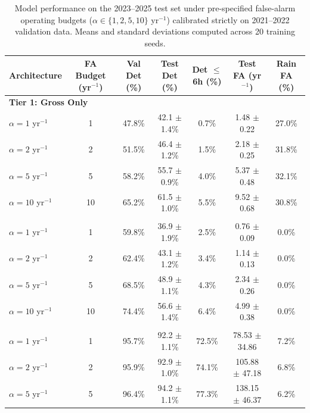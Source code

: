 \begin{table}[H]
\caption{Model performance on the 2023--2025 test set under pre-specified false-alarm operating budgets ($\alpha \in \{1, 2, 5, 10\}$ yr$^{-1}$) calibrated strictly on 2021--2022 validation data. Means and standard deviations computed across 20 training seeds.}
\label{tab:fa_budget_operating_points}
\centering
\small
\begin{tabularx}{\textwidth}{@{}X c c c c c c@{}}
\toprule
\textbf{Architecture} & \textbf{FA Budget (yr$^{-1}$)} & \textbf{Val Det (\%)} & \textbf{Test Det (\%)} & \textbf{Det $\le$ 6h (\%)} & \textbf{Test FA (yr$^{-1}$)} & \textbf{Rain FA (\%)} \\
\midrule
\multicolumn{7}{l}{\textbf{Tier 1: Gross Only}} \\[0.2em]
\quad $\alpha = 1$ yr$^{-1}$ & 1 & 47.8\% & 42.1 $\pm$ 1.4\% & 0.7\% & 1.48 $\pm$ 0.22 & 27.0\% \\
\quad $\alpha = 2$ yr$^{-1}$ & 2 & 51.5\% & 46.4 $\pm$ 1.2\% & 1.5\% & 2.18 $\pm$ 0.25 & 31.8\% \\
\quad $\alpha = 5$ yr$^{-1}$ & 5 & 58.2\% & 55.7 $\pm$ 0.9\% & 4.0\% & 5.37 $\pm$ 0.48 & 32.1\% \\
\quad $\alpha = 10$ yr$^{-1}$ & 10 & 65.2\% & 61.5 $\pm$ 1.0\% & 5.5\% & 9.52 $\pm$ 0.68 & 30.8\% \\
\addlinespace[0.3em]
\multicolumn{7}{l}{\textbf{Tier 1b: Gross + Weather}} \\[0.2em]
\quad $\alpha = 1$ yr$^{-1}$ & 1 & 59.8\% & 36.9 $\pm$ 1.9\% & 2.5\% & 0.76 $\pm$ 0.09 & 0.0\% \\
\quad $\alpha = 2$ yr$^{-1}$ & 2 & 62.4\% & 43.1 $\pm$ 1.2\% & 3.4\% & 1.14 $\pm$ 0.13 & 0.0\% \\
\quad $\alpha = 5$ yr$^{-1}$ & 5 & 68.5\% & 48.9 $\pm$ 1.1\% & 4.3\% & 2.34 $\pm$ 0.26 & 0.0\% \\
\quad $\alpha = 10$ yr$^{-1}$ & 10 & 74.4\% & 56.6 $\pm$ 1.4\% & 6.4\% & 4.99 $\pm$ 0.38 & 0.0\% \\
\addlinespace[0.3em]
\multicolumn{7}{l}{\textbf{Tier 2: Spectral Only}} \\[0.2em]
\quad $\alpha = 1$ yr$^{-1}$ & 1 & 95.7\% & 92.2 $\pm$ 1.1\% & 72.5\% & 78.53 $\pm$ 34.86 & 7.2\% \\
\quad $\alpha = 2$ yr$^{-1}$ & 2 & 95.9\% & 92.9 $\pm$ 1.0\% & 74.1\% & 105.88 $\pm$ 47.18 & 6.8\% \\
\quad $\alpha = 5$ yr$^{-1}$ & 5 & 96.4\% & 94.2 $\pm$ 1.1\% & 77.3\% & 138.15 $\pm$ 46.37 & 6.2\% \\

\end{tabularx}
\end{table}
